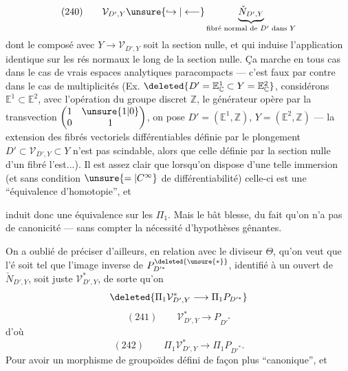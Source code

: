 \[
(240)\qquad\mathcal V_{D',Y}\unsure{\hookrightarrow|\longleftarrow}\underbrace{\check N_{D',Y}}_{\text{fibré normal de }D'\text{ dans }Y}
\]
 dont le composé avec $Y\longrightarrow\mathcal V_{D',Y}$ soit la section nulle, et qui induise l'application identique sur les rés normaux le long de la section nulle. Ça  marche en tous cas dans le cas de vrais espaces analytiques paracompacts --- c'est faux par contre dans le cas de multiplicités (Ex. $\deleted{D'=\mathbb E^1_{\mathbb C}\subset Y=\mathbb E^2_{\mathbb C}}$, considérons $\mathbb E^1\subset\mathbb E^2$, avec l'opération du groupe discret $\mathbb Z$,  le générateur opère par la transvection $\begin{pmatrix}1&\unsure{1|0}\\0&1\end{pmatrix}$, on pose $D'=(\mathbb E^1,\mathbb Z)$, $Y=(\mathbb E^2,\mathbb Z)$ --- la  extension des fibrés vectoriels différentiables définie par le plongement $D'\subset\mathcal V_{D',Y}\subset Y$ n'est pas scindable, alors que celle définie par la section nulle d'un fibré l'est...). Il est assez clair que lorsqu'on dispose d'une telle immersion (et sans condition $\unsure{=|C^{\infty}}$ de différentiabilité) celle-ci est une ``équivalence d'homotopie'', et

induit donc une équivalence sur les $\Pi_1$. Mais le bât blesse, du fait qu'on n'a pas de canonicité --- sans compter la nécessité d'hypothèses  gênantes. 

On a oublié de préciser d'ailleurs, en relation avec le diviseur $\Theta$, qu'on veut que l'é soit tel que l'image inverse de $P^{\deleted{\unsure{*}}}_{D'^{*}}$, identifié à un ouvert de  $\check N_{D',Y}$, soit juste $\mathcal V^{*}_{D',Y}$, de sorte qu'on   
\[
\deleted{\Pi_1\mathcal V^{*}_{D',Y}\longrightarrow\Pi_1P_{D'^{*}}}
\]
\[
(241)\qquad\mathcal V^{*}_{D',Y}\longrightarrow P_{D'^{*}}
\]
d'où
\[
(242)\qquad\Pi_1\mathcal V^{*}_{D',Y}\longrightarrow\Pi_1P_{D'^{*}}.
\]
Pour avoir un morphisme de groupoïdes défini de façon plus ``canonique'', et

